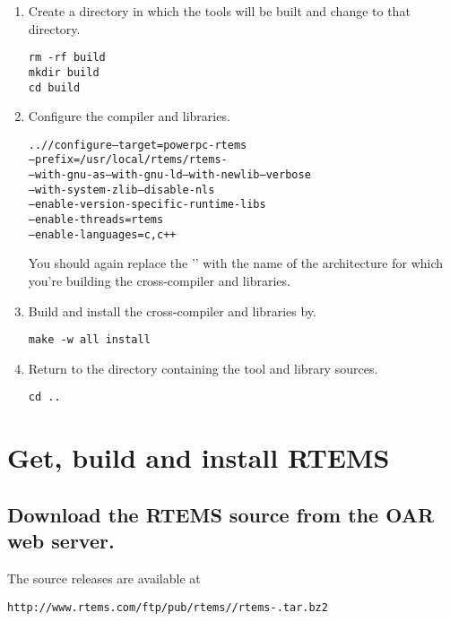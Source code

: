 \documentclass{report}
\begin{document}
\begin{enumerate}
\item Create a directory in which the tools will be built and
change to that directory.
\begin{verbatim}
rm -rf build
mkdir build
cd build
\end{verbatim}

\item Configure the compiler and libraries.
\begin{alltt}
../\GCC/configure --target=powerpc-rtems\rtemsVersion \verb@\@
            --prefix=/usr/local/rtems/rtems-\rtemsVersion \verb@\@
            --with-gnu-as --with-gnu-ld --with-newlib --verbose \verb@\@
            --with-system-zlib --disable-nls \verb@\@
            --enable-version-specific-runtime-libs \verb@\@
            --enable-threads=rtems \verb@\@
            --enable-languages=c,c++ 
\end{alltt}
You should again replace the '\verb@powerpc@' with the name of the architecture
for which you're
building the cross-compiler and libraries.

\item Build and install the cross-compiler and libraries by.
\begin{verbatim}
make -w all install
\end{verbatim}

\item Return to the directory containing the tool and library sources.
\begin{verbatim}
cd ..
\end{verbatim}
\end{enumerate}



\section{Get, build and install RTEMS}
\subsection {Download the RTEMS source from the OAR web server.}

The source releases are available at

\begin{alltt}
http://www.rtems.com/ftp/pub/rtems/\rtemsVersion/rtems-\rtemsVersion.tar.bz2
\end{alltt}
\end{document}
